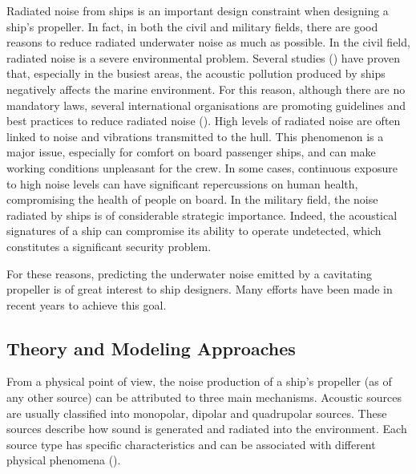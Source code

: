 Radiated noise from ships is an important design constraint when designing a ship's propeller. In fact, in both the civil and military fields, there are good reasons to reduce radiated underwater noise as much as possible. 
In the civil field, radiated noise is a severe environmental problem. Several studies (\cite{Rojano-Doñate2023}) have proven that, especially in the busiest areas, the acoustic pollution produced by ships negatively affects the marine environment. For this reason, although there are no mandatory laws, several international organisations are promoting guidelines and best practices to reduce radiated noise (\cite{MEPC802023}). 
High levels of radiated noise are often linked to noise and vibrations transmitted to the hull. This phenomenon is a major issue, especially for comfort on board passenger ships, and can make working conditions unpleasant for the crew. In some cases, continuous exposure to high noise levels can have significant repercussions on human health, compromising the health of people on board.
In the military field, the noise radiated by ships is of considerable strategic importance. Indeed, the acoustical signatures of a ship can compromise its ability to operate undetected, which constitutes a significant security problem.

For these reasons, predicting the underwater noise emitted by a cavitating propeller is of great interest to ship designers. Many efforts have been made in recent years to achieve this goal.

\subsection{Theory and Modeling Approaches}

From a physical point of view, the noise production of a ship's propeller (as of any other source) can be attributed to three main mechanisms. Acoustic sources are usually classified into monopolar, dipolar and quadrupolar sources. These sources describe how sound is generated and radiated into the environment. Each source type has specific characteristics and can be associated with different physical phenomena (\cite{Russell1999}). 

